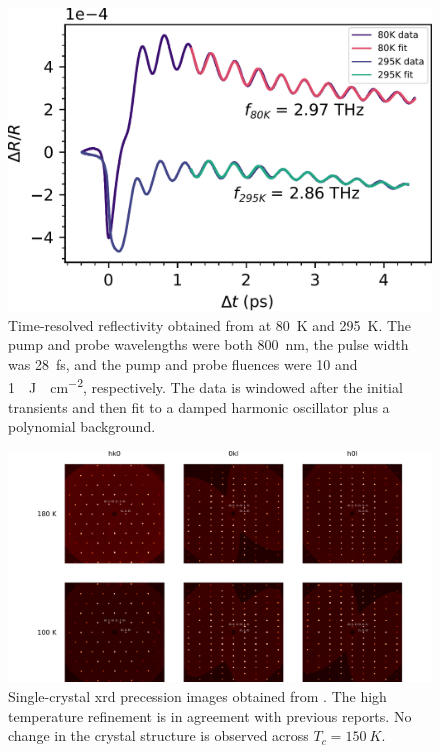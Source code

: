 \begin{figure}
\centering
\includegraphics[width=\textwidth]{./gfx/ch6/pp.pdf}
\captionsetup{singlelinecheck=off}
\caption[]{
\label{cmb-pp}
Time-resolved reflectivity obtained from \cmb at \qty{80}{K} and \qty{295}{K}.
The pump and probe wavelengths were both \qty{800}{nm}, the pulse width was \qty{28}{fs}, and the pump and probe fluences were \num{10} and \qty{1}{\mu J \cdot cm^{-2}}, respectively.
The data is windowed after the initial transients and then fit to a damped harmonic oscillator plus a polynomial background.
}
\end{figure}

\begin{figure}
\centering
\includegraphics[width=\textwidth]{./gfx/ch6/xrd.pdf}
\captionsetup{singlelinecheck=off}
\caption[]{
\label{cmb-xrd}
Single-crystal \gls{xrd} precession images obtained from \cmb.
The high temperature refinement is in agreement with previous reports\citep{gibson_magnetic_2015}.
No change in the crystal structure is observed across $T_c=\qty{150}{K}$.
}
\end{figure}

